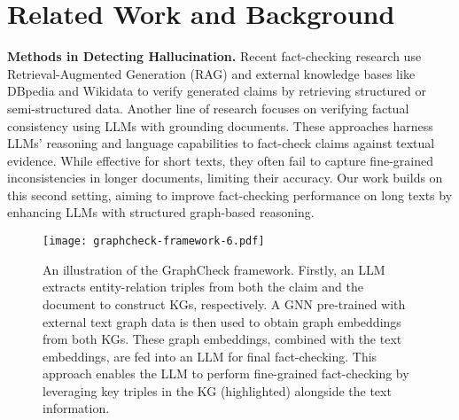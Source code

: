 \section{Related Work and Background}
\textbf{Methods in Detecting Hallucination.} 
Recent fact-checking research \cite{yuan2023zero, kim2023factkg} use Retrieval-Augmented Generation (RAG) \cite{Fan2024ASO,yang2025retrieval} and external knowledge bases like DBpedia \cite{lehmann2015dbpedia} and Wikidata \cite{vrandevcic2014wikidata} to verify generated claims by retrieving structured or semi-structured data.
Another line of research \cite{manakul2023selfcheckgpt, mundler2023self} focuses on verifying factual consistency using LLMs with grounding documents. These approaches harness LLMs’ reasoning and language capabilities to fact-check claims against textual evidence. While effective for short texts, they often fail to capture fine-grained inconsistencies in longer documents, limiting their accuracy.
Our work builds on this second setting, aiming to improve fact-checking performance on long texts by enhancing LLMs with structured graph-based reasoning.

\begin{figure*}[t!]
    \centering
    \texttt{[image: graphcheck-framework-6.pdf]}
    \caption{An illustration of the GraphCheck framework. Firstly, an LLM extracts entity-relation triples from both the claim and the document to construct KGs, respectively. 
    A GNN pre-trained with external text graph data is then used to obtain graph embeddings from both KGs. 
    These graph embeddings, combined with the text embeddings, are fed into an LLM for final fact-checking. 
    This approach enables the LLM to perform fine-grained fact-checking by leveraging key triples in the KG (highlighted) alongside the text information.}
    \label{fig:pipline}
\end{figure*}

